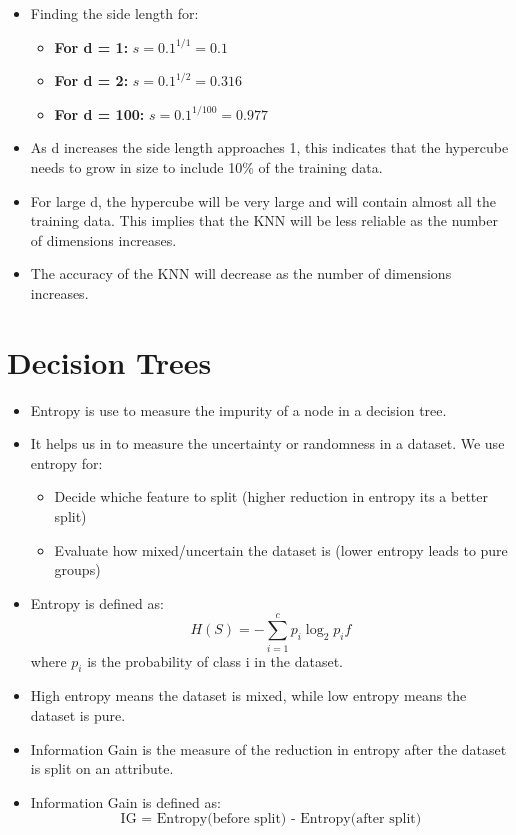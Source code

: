 \documentclass{article}
\begin{document}
\begin{enumerate}
\begin{itemize}
    \item Finding the side length for:
    \begin{itemize}
        \item \textbf{For d = 1:} $s = 0.1^{1/1} = 0.1$
        \item \textbf{For d = 2:} $s = 0.1^{1/2} = 0.316$
        \item \textbf{For d = 100:} $s = 0.1^{1/100} = 0.977$
    \end{itemize}

    \item As d increases the side length approaches 1, this indicates that the hypercube needs to grow in size to include 10\% of the training data.
    \item For large d, the hypercube will be very large and will contain almost all the training data. This implies that the KNN will be less reliable as the number of dimensions increases.
    \item The accuracy of the KNN will decrease as the number of dimensions increases.

    
 \end{itemize}


\end{enumerate}

\clearpage

\section{Decision Trees}
\begin{itemize}
   \item Entropy is use to measure the impurity of a node in a decision tree.
   \item It helps us in to measure the uncertainty or randomness in a dataset. We use entropy for:
     \begin{itemize}
      \item Decide whiche feature to split (higher reduction in entropy its a better split)
      \item Evaluate how mixed/uncertain the dataset is (lower entropy leads to pure groups) 
     \end{itemize}
   \item Entropy is defined as:
   \[
   H(S) = -\sum_{i=1}^{c} p_i \log_2 p_if
   \]
   where $p_i$ is the probability of class i in the dataset.
   \item High entropy means the dataset is mixed, while low entropy means the dataset is pure.
   \item Information Gain is the measure of the reduction in entropy after the dataset is split on an attribute.
   \item Information Gain is defined as:
   \[\text{IG = Entropy(before split) - Entropy(after split)}\]
\end{itemize}
\end{document}
